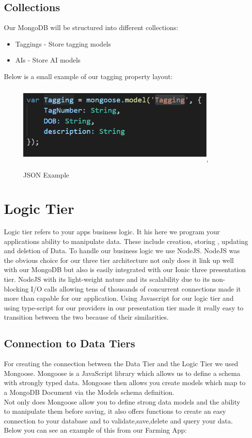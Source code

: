 \documentclass[12pt,a4paper,oneside,openany]{book}
\begin{document}
\subsection{Collections}
Our MongoDB will be structured into different collections:

\begin{itemize}
    \item Taggings - Store tagging models
    \item AIs - Store AI models
\end{itemize}

Below is a small example of our tagging property layout:
    
\begin{figure}[ht]
\renewcommand\thefigure{5.2}
\centering
\includegraphics[width=10cm,height=4cm]{Images/modelJSON.png},
\caption{JSON Example}
\label{json}
\end{figure}


\section{Logic Tier}
Logic tier refers to your apps business logic. It his here we program your applications ability to manipulate data. These include creation, storing , updating and deletion of Data. To handle our business logic we use NodeJS. NodeJS was the obvious choice for our three tier architecture not only does it link up well with our MongoDB but also is easily integrated with our Ionic three presentation tier. NodeJS with its light-weight nature and its scalability due to its non-blocking I/O calls allowing tens of thousands of concurrent connections made it more than capable for our application. Using Javascript for our logic tier and using type-script for our providers in our presentation tier made it really easy to transition between the two because of their similarities.

\subsection{Connection to Data Tiers}
For creating the connection between the Data Tier and the Logic Tier we used Mongoose. Mongoose is a JavaScript library which allows us to define a schema with strongly typed data. Mongoose then allows you create models which map to a MongoDB Document via the Models schema definition. \cite{mongoose}
\\
Not only does Mongoose allow you to deﬁne strong data models and the ability to manipulate them before saving, it also oﬀers functions to create an easy connection to your database and to validate,save,delete and query your data. Below you can see an example of this from our Farming App: 
\end{document}
